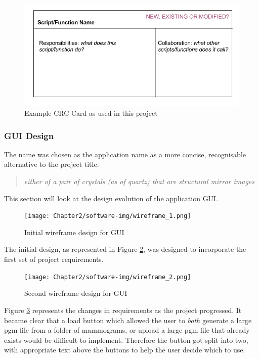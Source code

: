 \begin{figure}[H]
  \center
  \includegraphics[scale=0.5]{Chapter2/software-img/crc.png}
  \caption{Example CRC Card as used in this project}
  \label{fig:crc}
\end{figure}

\subsubsection{GUI Design}
\label{sssec:gui-design}

The name  was chosen as the application name as a more concise, recognisable alternative to the project title.

\begin{quotation}
  \textit{either of a pair of crystals (as of quartz) that are structural mirror images \cite{enantiomorph}}
\end{quotation}

This section will look at the design evolution of the application GUI.

\begin{figure}[H]
  \center
  \texttt{[image: Chapter2/software-img/wireframe\_1.png]}
  \caption{Initial wireframe design for GUI}
  \label{fig:wireframe1}
\end{figure}

The initial design, as represented in Figure \ref{fig:wireframe1}, was designed to incorporate the first set of project requirements.

\begin{figure}[H]
  \center
  \texttt{[image: Chapter2/software-img/wireframe\_2.png]}
  \caption{Second wireframe design for GUI}
  \label{fig:wireframe2}
\end{figure}

Figure \ref{fig:wireframe2} represents the changes in requirements as the project progressed. It became clear that a load button which allowed the user to \textit{both} generate a large pgm file from a folder of mammograms, or upload a large pgm file that already exists would be difficult to implement. Therefore the button got split into two, with appropriate text above the buttons to help the user decide which to use.

